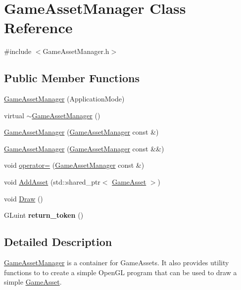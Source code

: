 \hypertarget{classGameAssetManager}{}\section{Game\+Asset\+Manager Class Reference}
\label{classGameAssetManager}


{\ttfamily \#include $<$Game\+Asset\+Manager.\+h$>$}

\subsection*{Public Member Functions}
\begin{DoxyCompactItemize}
\item 
\hyperlink{classGameAssetManager_aaa0d58e276cc10ad91a7457085598a71}{Game\+Asset\+Manager} (Application\+Mode)
\item 
virtual \hyperlink{classGameAssetManager_a1270bd61ecbcca563f079803e40c9b77}{$\sim$\+Game\+Asset\+Manager} ()
\item 
\hyperlink{classGameAssetManager_a2c9adcb72faa154c87eadc9bafe5269d}{Game\+Asset\+Manager} (\hyperlink{classGameAssetManager}{Game\+Asset\+Manager} const \&)
\item 
\hyperlink{classGameAssetManager_a44f6e2fd6b8ff1dd64e5697f1be7386d}{Game\+Asset\+Manager} (\hyperlink{classGameAssetManager}{Game\+Asset\+Manager} const \&\&)
\item 
void \hyperlink{classGameAssetManager_ac72678a4ad5378c685aa6bae84a4e712}{operator=} (\hyperlink{classGameAssetManager}{Game\+Asset\+Manager} const \&)
\item 
void \hyperlink{classGameAssetManager_ad3de8ff00d55ba04728b1de8213b2349}{Add\+Asset} (std\+::shared\+\_\+ptr$<$ \hyperlink{classGameAsset}{Game\+Asset} $>$)
\item 
void \hyperlink{classGameAssetManager_a32837132bd70a9a9ed537323c2d3d886}{Draw} ()
\item 
G\+Luint {\bfseries return\+\_\+token} ()\hypertarget{classGameAssetManager_ad9795f6c4fb62772fcb1a8bbf2f99fc4}{}\label{classGameAssetManager_ad9795f6c4fb62772fcb1a8bbf2f99fc4}

\end{DoxyCompactItemize}


\subsection{Detailed Description}
\hyperlink{classGameAssetManager}{Game\+Asset\+Manager} is a container for Game\+Assets. It also provides utility functions to to create a simple Open\+GL program that can be used to draw a simple \hyperlink{classGameAsset}{Game\+Asset}. 

